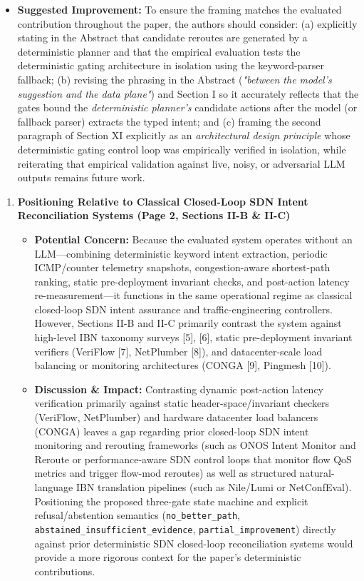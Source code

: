 \documentclass[11pt,a4paper]{article}
\begin{document}
\begin{itemize}[leftmargin=1.8em,itemsep=2pt]
\item \textbf{Suggested Improvement:} To ensure the framing matches the evaluated contribution throughout the paper, the authors should consider: (a) explicitly stating in the Abstract that candidate reroutes are generated by a deterministic planner and that the empirical evaluation tests the deterministic gating architecture in isolation using the keyword-parser fallback; (b) revising the phrasing in the Abstract (\emph{"between the model's suggestion and the data plane"}) and Section I so it accurately reflects that the gates bound the \emph{deterministic planner's} candidate actions after the model (or fallback parser) extracts the typed intent; and (c) framing the second paragraph of Section XI explicitly as an \emph{architectural design principle} whose deterministic gating control loop was empirically verified in isolation, while reiterating that empirical validation against live, noisy, or adversarial LLM outputs remains future work.
\end{itemize}
\begin{enumerate}[leftmargin=1.6em,itemsep=3pt]
\item \textbf{Positioning Relative to Classical Closed-Loop SDN Intent Reconciliation Systems (Page 2, Sections II-B \& II-C)}
\begin{itemize}[leftmargin=1.8em,itemsep=2pt]
\item \textbf{Potential Concern:} Because the evaluated system operates without an LLM—combining deterministic keyword intent extraction, periodic ICMP/counter telemetry snapshots, congestion-aware shortest-path ranking, static pre-deployment invariant checks, and post-action latency re-measurement—it functions in the same operational regime as classical closed-loop SDN intent assurance and traffic-engineering controllers. However, Sections II-B and II-C primarily contrast the system against high-level IBN taxonomy surveys [5], [6], static pre-deployment invariant verifiers (VeriFlow [7], NetPlumber [8]), and datacenter-scale load balancing or monitoring architectures (CONGA [9], Pingmesh [10]).
\item \textbf{Discussion \& Impact:} Contrasting dynamic post-action latency verification primarily against static header-space/invariant checkers (VeriFlow, NetPlumber) and hardware datacenter load balancers (CONGA) leaves a gap regarding prior closed-loop SDN intent monitoring and rerouting frameworks (such as ONOS Intent Monitor and Reroute or performance-aware SDN control loops that monitor flow QoS metrics and trigger flow-mod reroutes) as well as structured natural-language IBN translation pipelines (such as Nile/Lumi or NetConfEval). Positioning the proposed three-gate state machine and explicit refusal/abstention semantics (\texttt{no\_better\_path}, \texttt{abstained\_insufficient\_evidence}, \texttt{partial\_improvement}) directly against prior deterministic SDN closed-loop reconciliation systems would provide a more rigorous context for the paper's deterministic contributions.
\end{itemize}
\end{enumerate}
\end{document}
